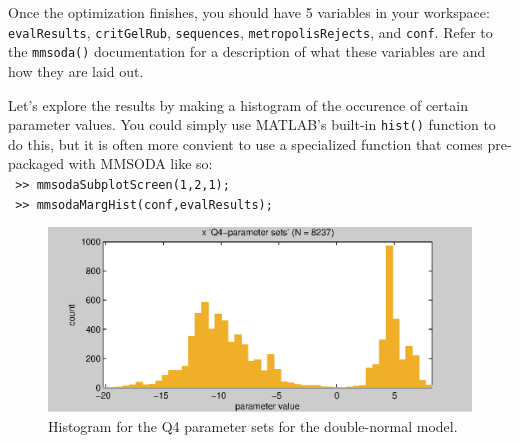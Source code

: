 Once the optimization finishes, you should have 5 variables in your workspace: \texttt{evalResults}, \texttt{critGelRub}, \texttt{sequences}, \texttt{metropolisRejects}, and \texttt{conf}. Refer to the \texttt{mmsoda()} documentation for a description of what these variables are and how they are laid out.

Let's explore the results by making a histogram of the occurence of certain parameter values. You could simply use MATLAB's built-in \texttt{hist()} function to do this, but it is often more convient to use a specialized function that comes pre-packaged with MMSODA like so:\\
\texttt{ >> mmsodaSubplotScreen(1,2,1);}\\
\texttt{ >> mmsodaMargHist(conf,evalResults);}\\



\begin{figure}[htb]
  \centering
    \includegraphics[width=\linewidth , keepaspectratio]{./../eps/mmsodaMargHist.eps}
  \caption{Histogram for the Q4 parameter sets for the double-normal model.}
  \label{fig:mmsodaMargHist}
\end{figure}




